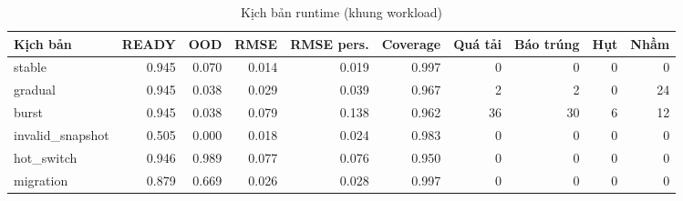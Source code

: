 \begin{table}[H]\centering\small
\caption{Kịch bản runtime (khung workload)}\label{tab:w10-runtime}
\begin{tabular}{lrrrrrrrrr}\toprule
Kịch bản & READY & OOD & RMSE & RMSE pers. & Coverage & Quá tải & Báo trúng & Hụt & Nhầm \\\midrule
stable & 0.945 & 0.070 & 0.014 & 0.019 & 0.997 & 0 & 0 & 0 & 0 \\
gradual & 0.945 & 0.038 & 0.029 & 0.039 & 0.967 & 2 & 2 & 0 & 24 \\
burst & 0.945 & 0.038 & 0.079 & 0.138 & 0.962 & 36 & 30 & 6 & 12 \\
invalid\_snapshot & 0.505 & 0.000 & 0.018 & 0.024 & 0.983 & 0 & 0 & 0 & 0 \\
hot\_switch & 0.946 & 0.989 & 0.077 & 0.076 & 0.950 & 0 & 0 & 0 & 0 \\
migration & 0.879 & 0.669 & 0.026 & 0.028 & 0.997 & 0 & 0 & 0 & 0 \\
\bottomrule\end{tabular}
\end{table}
